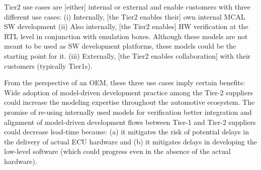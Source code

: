Tier2 use cases are [either] internal or external and enable customers with three different use cases: (i) Internally, [the Tier2 enables their] own internal MCAL SW development (ii) Also internally, [the Tier2 enables] HW verification at the RTL level in conjunction with emulation boxes. Although these models are not meant to be used as SW development platforms, these models could be the starting point for it. (iii) Externally, [the Tier2 enables collaboration] with their customers (typically Tier1s).

From the perspective of an OEM, these three use cases imply certain benefits: Wide adoption of model-driven development practice among the Tier-2 suppliers could increase the modeling expertise throughout the automotive ecosystem. The promise of re-using internally used models for verification better integration and alignment of model-driven development flows between Tier-1 and Tier-2 suppliers could decrease lead-time because: (a) it mitigates the risk of potential delays in the delivery of actual ECU hardware and (b) it mitigates delays in developing the low-level software (which could progress even in the absence of the actual hardware).
